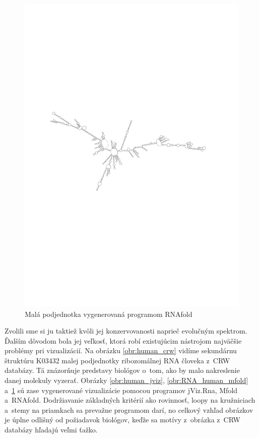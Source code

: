 \begin{figure}
  \centering
  \includegraphics[clip, trim=2.5cm 10cm 3cm 10cm, angle=90, width=1\textwidth]{../img/human_RNAfold}
  \caption{Malá podjednotka vygenerovaná programom RNAfold }
  \label{obr:RNA_human_rnafold}
\end{figure}

Zvolili sme si ju taktiež kvôli jej konzervovanosti naprieč evolučným spektrom. Ďalším
dôvodom bola jej veľkosť, ktorá robí existujúcim nástrojom najväčšie problémy
pri vizualizácií. Na obrázku \ref{obr:human_crw} vidíme sekundárnu štruktúru 
K03432 malej podjednotky ribozomálnej RNA človeka z~CRW databázy.
Tá znázorňuje predstavy biológov o~tom, ako by malo nakreslenie danej molekuly vyzerať.
Obrázky \ref{obr:human_jviz}, \ref{obr:RNA_human_mfold} a~\ref{obr:RNA_human_rnafold}
sú zase vygenerované vizualizácie pomocou programov jViz.Rna, Mfold a~RNAfold.
Dodržiavanie základných kritérií ako rovinnosť, loopy na kružniciach a~stemy na priamkach
sa prevažne programom darí, no celkový vzhľad obrázkov je úplne odlišný od požiadavok
biológov, keďže sa motívy z~obrázka z~CRW databázy hľadajú veľmi ťažko.






